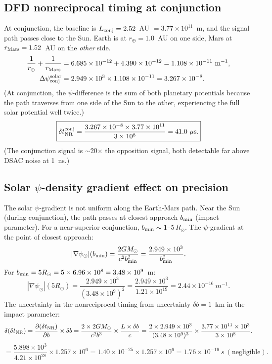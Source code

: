 \documentclass[aps,prd,twocolumn,superscriptaddress,nofootinbib,longbibliography]{revtex4-2}
\begin{document}
\subsection{DFD nonreciprocal timing at conjunction}

At conjunction, the baseline is $L_{\rm conj} = 2.52$~AU $= 3.77\times10^{11}$~m,
and the signal path passes close to the Sun.  Earth is at $r_\oplus = 1.0$~AU
on one side, Mars at $r_{\rm Mars} = 1.52$~AU on the \emph{other} side.
\begin{align}
\frac{1}{r_\oplus} + \frac{1}{r_{\rm Mars}}
&= 6.685\times10^{-12} + 4.390\times10^{-12} = 1.108\times10^{-11}\ \si{m^{-1}},\nonumber\\
\Delta\psi_{\rm conj}^{\rm solar}
&= 2.949\times10^3\times1.108\times10^{-11} = 3.267\times10^{-8}.
\end{align}
(At conjunction, the $\psi$-difference is the sum of both planetary potentials
because the path traverses from one side of the Sun to the other, experiencing
the full solar potential well twice.)
\begin{equation}
\boxed{
\delta t_{\rm NR}^{\rm conj}
= \frac{3.267\times10^{-8}\times3.77\times10^{11}}{3\times10^8}
= 41.0\ \mu\si{s}.
}
\end{equation}
(The conjunction signal is $\sim$20$\times$ the opposition signal, both
detectable far above DSAC noise at 1~ns.)

\subsection{Solar $\psi$-density gradient effect on precision}

The solar $\psi$-gradient is not uniform along the Earth-Mars path.
Near the Sun (during conjunction), the path passes at closest approach
$b_{\rm min}$ (impact parameter).  For a near-superior conjunction,
$b_{\rm min}\sim 1$--$5\,R_\odot$.  The $\psi$-gradient at the point of
closest approach:
\begin{equation}
|\nabla\psi_\odot|(b_{\rm min}) = \frac{2GM_\odot}{c^2 b_{\rm min}^2}
= \frac{2.949\times10^3}{b_{\rm min}^2}.
\end{equation}
For $b_{\rm min} = 5R_\odot = 5\times6.96\times10^8 = 3.48\times10^9$~m:
\begin{equation}
|\nabla\psi_\odot|(5R_\odot) = \frac{2.949\times10^3}{(3.48\times10^9)^2}
= \frac{2.949\times10^3}{1.21\times10^{19}} = 2.44\times10^{-16}\ \si{m^{-1}}.
\end{equation}
The uncertainty in the nonreciprocal timing from uncertainty
$\delta b = 1$~km in the impact parameter:
\begin{equation}
\delta(\delta t_{\rm NR}) = \frac{\partial(\delta t_{\rm NR})}{\partial b}
\times\delta b
= \frac{2\times2GM_\odot}{c^2 b^3}\times\frac{L\times\delta b}{c}
= \frac{2\times2.949\times10^3}{(3.48\times10^9)^3}
\times\frac{3.77\times10^{11}\times10^3}{3\times10^8}.
\end{equation}
\begin{equation}
= \frac{5.898\times10^3}{4.21\times10^{28}}\times1.257\times10^6
= 1.40\times10^{-25}\times1.257\times10^6 = 1.76\times10^{-19}\ \si{s}\ (\text{negligible}).
\end{equation}
\end{document}
